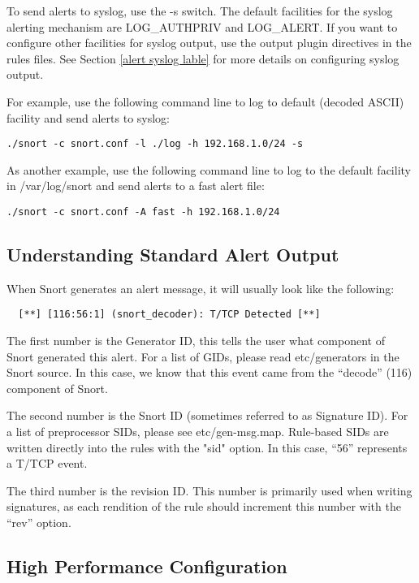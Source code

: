 \documentclass[english]{report}
\begin{document}
To send alerts to syslog, use the -s switch. The default facilities
for the syslog alerting mechanism are LOG\_AUTHPRIV and LOG\_ALERT.
If you want to configure other facilities for syslog output, use the
output plugin directives in the rules files. See Section \ref{alert syslog lable}
for more details on configuring syslog output.

For example, use the following command line to log to default (decoded ASCII) facility and send alerts to syslog: 

\begin{verbatim}
./snort -c snort.conf -l ./log -h 192.168.1.0/24 -s
\end{verbatim}

As another example, use the following command line to log to the default facility in /var/log/snort and send alerts to a
fast alert file: 

\begin{verbatim}
./snort -c snort.conf -A fast -h 192.168.1.0/24
\end{verbatim}

\subsection{Understanding Standard Alert Output}

When Snort generates an alert message, it will usually look like the following:
 
 \begin{verbatim}	 
  [**] [116:56:1] (snort_decoder): T/TCP Detected [**]
 \end{verbatim}
  	 
  The first number is the Generator ID, this tells the user what
  component of Snort generated this alert. For a list of GIDs, please read
  etc/generators in the Snort source. In this case, we know that this event
  came from the ``decode'' (116) component of Snort.
  	 
  The second number is the Snort ID (sometimes referred to as
  Signature ID). For a list of preprocessor SIDs, please see
  etc/gen-msg.map.  Rule-based SIDs are written directly into the rules
  with the "sid" option. In this case, ``56'' represents a T/TCP event.
  	 
  The third number is the revision ID. This number is primarily
  used when writing signatures, as each rendition of the rule should
  increment this number with the ``rev'' option.



\subsection{High Performance Configuration}
\end{document}
